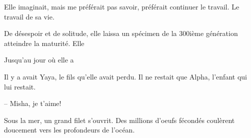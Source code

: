 Elle imaginait, mais me préférait pas savoir, préférait continuer le travail.
Le travail de sa vie. 

De désespoir et de solitude, elle laissa un spécimen de la 300ième génération atteindre la maturité.
Elle 

Jusqu'au jour où elle a 

Il y a avait Yaya, le fils qu'elle avait perdu.
Il ne restait que Alpha, l'enfant qui lui restait.

\sautSection{}

-- Misha, je t'aime!

Sous la mer, un grand filet s'ouvrit. Des millions d'oeufs fécondés coulèrent
doucement vers les profondeurs de l'océan.


